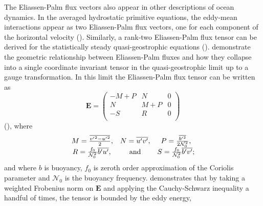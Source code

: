 \documentclass[12pt,a4paper]{report}
\newcommand*\mean[1]{\overline{#1}}
\newcommand*\res[1]{{#1}^{\prime}}
\begin{document}
                
                The Eliassen-Palm flux vectors also appear in other descriptions of ocean dynamics.
                In the averaged hydrostatic primitive equations, the eddy-mean interactions
                appear as two Eliassen-Palm flux vectors, one for each component of the horizontal velocity
                (\cite{young2012exact}). Similarly, a rank-two Eliassen-Palm flux tensor
                can be derived for the statistically steady quasi-geostrophic equations (\cite{cronin1996eddy}). \cite{maddison2013eliassen} demonstrate
                the geometric relationship between Eliassen-Palm fluxes and how they
                collapse into a single coordinate invariant tensor in the
                quasi-geostrophic limit up to a gauge transformation.
                In this limit the Eliassen-Palm flux tensor can be written as
                \begin{equation}
                \boldsymbol{E} 
                =\left(  \begin{array}{ccc}
                -M+P &
                N & 0 \\
                N &  
                M + P & 0\\
                -S  &  
                R & 0\\
                \end{array} \right) 
                \end{equation}
                (\cite{plumb1986three}), where 
                \begin{equation}
                \begin{array}{ccc}
                M = \frac{\mean{{\res{v}}^{2} - {\res{u}}^{2}}}{2}, & 
                N = \mean{\res{u}\res{v} }, &
                P =  \frac{\mean{{\res{b}}^{2}}}{2\mathcal{N}_{0}^{2}},  \\ 
                R =  \frac{f_{0}}{\mathcal{N}_{0}^{2}}\mean{\res{b}\res{u}}, \, & \rm and  &  
                S = \frac{f_{0}}{\mathcal{N}_{0}^{2}}\mean{\res{b}\res{v}} ;
                \end{array} 
                \end{equation}
                 and where $b$ is buoyancy, $f_{0}$ is zeroth order approximation of the Coriolis parameter and $\mathcal{N}_{0}$ is the buoyancy frequency. \cite{marshall2012framework}
                demonstrates that by taking a weighted Frobenius norm on $\boldsymbol{E} $
                and applying the Cauchy-Schwarz inequality a handful of times, the 
                 tensor is bounded by the eddy energy,
\end{document}
